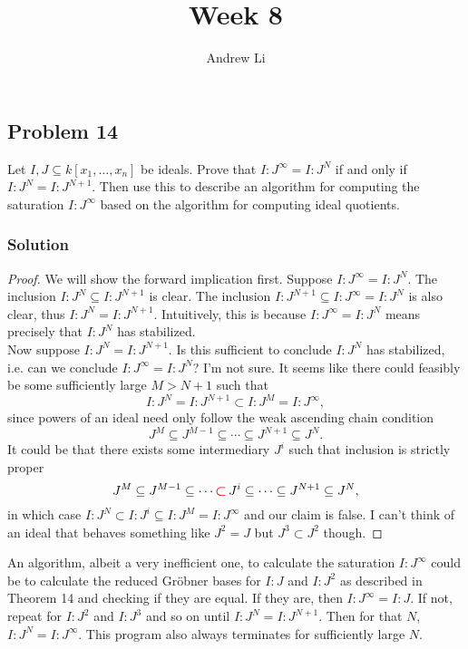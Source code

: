 \documentclass{homework}
\title{Week 8}
\author{Andrew Li}
\begin{document}
    \maketitle
    
    \setcounter{section}{4}
    \setcounter{subsection}{3}
    \subsection{Problem 14}
    Let $I, J \subseteq k[x_1, \dots, x_n]$ be ideals. Prove that $I:J^\infty = I:J^N$ if and only if $I:J^N = I:J^{N+1}$. Then use this to describe an algorithm for computing the saturation $I:J^\infty$ based on the algorithm for computing ideal quotients.
    
    \subsubsection{Solution}
    \begin{proof}
        We will show the forward implication first. Suppose $I:J^\infty = I:J^N$. The inclusion $I:J^N \subseteq I:J^{N+1}$ is clear. The inclusion $I:J^{N+1} \subseteq I:J^\infty = I:J^N$ is also clear, thus $I:J^N = I:J^{N+1}$. Intuitively, this is because $I:J^\infty = I:J^N$ means precisely that $I:J^N$ has stabilized. \\
        
        Now suppose $I:J^N = I:J^{N+1}$. Is this sufficient to conclude $I:J^N$ has stabilized, i.e. can we conclude $I:J^\infty = I:J^N$? I'm not sure. It seems like there could feasibly be some sufficiently large $M > N+1$ such that
        \[I:J^N = I:J^{N+1} \subset I:J^{M} = I:J^\infty,\]
        since powers of an ideal need only follow the weak ascending chain condition
        \[J^M \subseteq J^{M-1} \subseteq \cdots \subseteq J^{N+1} \subseteq J^N.\]
        It could be that there exists some intermediary $J^i$ such that inclusion is strictly proper
        \[J^M \subseteq J^{M-1} \subseteq \cdots {\color{red} \boldsymbol{\subset}\,} J^i \subseteq \cdots \subseteq J^{N+1} \subseteq J^N,\]
        in which case $I:J^N \subset I:J^i \subseteq I:J^M = I:J^\infty$ and our claim is false. I can't think of an ideal that behaves something like $J^2 = J$ but $J^3 \subset J^2$ though.
    \end{proof}
    
    An algorithm, albeit a very inefficient one, to calculate the saturation $I:J^\infty$ could be to calculate the reduced Gr\"obner bases for $I:J$ and $I:J^2$ as described in Theorem 14 and checking if they are equal. If they are, then $I:J^\infty = I:J$. If not, repeat for $I:J^2$ and $I:J^3$ and so on until $I:J^N = I:J^{N+1}$. Then for that $N$, $I:J^N = I:J^\infty$. This program also always terminates for sufficiently large $N$.
\end{document}
